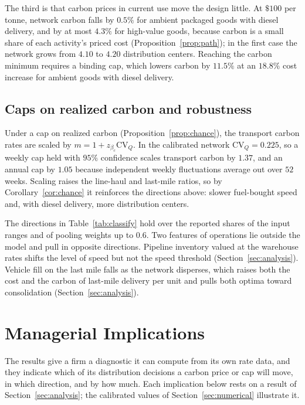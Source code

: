 \documentclass[11pt]{article}
\theoremstyle{definition}
\theoremstyle{remark}
\theoremstyle{plain}
\begin{document}
The third is that carbon prices in current use move the design little. At $\$100$ per tonne, network carbon
falls by $0.5\%$ for ambient packaged goods with diesel delivery, and by at most $4.3\%$ for high-value goods,
because carbon is a small share of each activity's priced cost (Proposition~\ref{prop:path}); in the first
case the network grows from $4.10$ to $4.20$ distribution centers. Reaching the carbon minimum requires a
binding cap, which lowers carbon by $11.5\%$ at an $18.8\%$ cost increase for ambient goods with diesel
delivery.

\subsection{Caps on realized carbon and robustness}\label{sec:robust}

Under a cap on realized carbon (Proposition~\ref{prop:chance}), the transport carbon rates are scaled by
$m=1+z_{\beta_c}\mathrm{CV}_Q$. In the calibrated network $\mathrm{CV}_Q=0.225$, so a weekly cap held with
$95\%$ confidence scales transport carbon by $1.37$, and an annual cap by $1.05$ because independent weekly
fluctuations average out over $52$ weeks. Scaling raises the line-haul and last-mile ratios, so by
Corollary~\ref{cor:chance} it reinforces the directions above: slower fuel-bought speed and, with diesel
delivery, more distribution centers.

The directions in Table~\ref{tab:classify} hold over the reported shares of the input ranges and of pooling
weights up to $0.6$. Two features of operations lie outside the model and pull in opposite directions.
Pipeline inventory valued at the warehouse rates shifts the level of speed but not the speed threshold
(Section~\ref{sec:analysis}). Vehicle fill on the last mile falls as the network disperses, which raises both
the cost and the carbon of last-mile delivery per unit and pulls both optima toward consolidation
(Section~\ref{sec:analysis}).

\section{Managerial Implications}\label{sec:managerial}

The results give a firm a diagnostic it can compute from its own rate data, and they indicate which of its
distribution decisions a carbon price or cap will move, in which direction, and by how much. Each implication
below rests on a result of Section~\ref{sec:analysis}; the calibrated values of Section~\ref{sec:numerical}
illustrate it.
\end{document}
